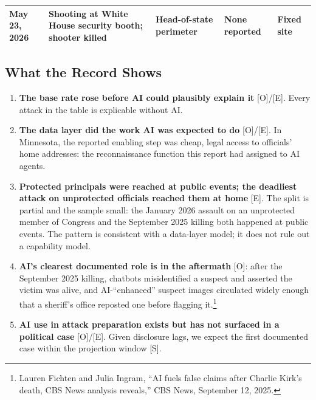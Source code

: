 \documentclass[11pt,letterpaper]{article}
\begin{document}
\begin{table}[!htbp]
\begin{tabular}{L{1.7cm}L{5.2cm}L{2.3cm}L{2.6cm}L{2.6cm}}
May 23, 2026 & Shooting at White House security booth; shooter killed & Head-of-state perimeter & None reported & Fixed site \\
\bottomrule
\end{tabular}
\par{}
\end{table}



\subsection{What the Record Shows}

\begin{enumerate}
  \item \textbf{The base rate rose before AI could plausibly explain it} [O]/[E]. Every attack in the table is explicable without AI.
  \item \textbf{The data layer did the work AI was expected to do} [O]/[E]. In Minnesota, the reported enabling step was cheap, legal access to officials' home addresses: the reconnaissance function this report had assigned to AI agents.
  \item \textbf{Protected principals were reached at public events; the deadliest attack on unprotected officials reached them at home} [E]. The split is partial and the sample small: the January 2026 assault on an unprotected member of Congress and the September 2025 killing both happened at public events. The pattern is consistent with a data-layer model; it does not rule out a capability model.
  \item \textbf{AI's clearest documented role is in the aftermath} [O]: after the September 2025 killing, chatbots misidentified a suspect and asserted the victim was alive, and AI-``enhanced'' suspect images circulated widely enough that a sheriff's office reposted one before flagging it.\footnote{Lauren Fichten and Julia Ingram, ``AI fuels false claims after Charlie Kirk's death, CBS News analysis reveals,'' CBS News, September 12, 2025.}
  \item \textbf{AI use in attack preparation exists but has not surfaced in a political case} [O]/[E]. Given disclosure lags, we expect the first documented case within the projection window [S].
\end{enumerate}
\end{document}
